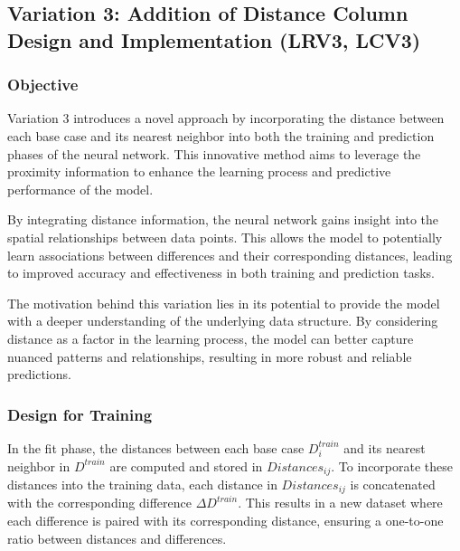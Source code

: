 \documentclass[a4paper, 12pt]{report}
\begin{document}
\subsection{Variation 3: Addition of Distance Column Design and Implementation (LRV3, LCV3)}
\label{sec:linger_regr_class_variation3_model}

\subsubsection{Objective}
Variation 3 introduces a novel approach by incorporating the distance between each base case and its nearest neighbor into both the training and prediction 
phases of the neural network. This innovative method aims to leverage the proximity information to enhance the learning process and predictive performance of the model.

By integrating distance information, the neural network gains insight into the spatial relationships between data points. 
This allows the model to potentially learn associations between differences and their corresponding distances, 
leading to improved accuracy and effectiveness in both training and prediction tasks.

The motivation behind this variation lies in its potential to provide the model with a deeper understanding of the underlying data structure. 
By considering distance as a factor in the learning process, the model can better capture nuanced patterns and relationships, 
resulting in more robust and reliable predictions.

\subsubsection{Design for Training}
In the fit phase, the distances between each base case $D^{train}_i$ and its nearest neighbor in $D^{train}$ are computed and stored in $Distances_{ij}$.
To incorporate these distances into the training data, each distance in $Distances_{ij}$ is concatenated with the corresponding difference $\Delta D^{train}$.
This results in a new dataset where each difference is paired with its corresponding distance, ensuring a one-to-one ratio between distances and differences.
\end{document}
